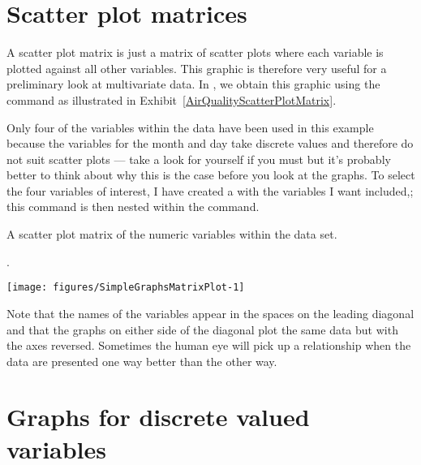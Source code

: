\section{Scatter plot matrices} 
\label{ScatterPlotMatrices} 
 
A scatter plot matrix is just a matrix of scatter plots where each variable is plotted against all other variables. This graphic is therefore very useful for a preliminary look at multivariate data. In \R{}, we obtain this graphic using the  command as illustrated in Exhibit~\ref{AirQualityScatterPlotMatrix}. 
 
Only four of the variables within the  data have been used in this example because the variables for the month and day take discrete values and therefore do not suit scatter plots --- take a look for yourself if you must but it's probably better to think about why this is the case before you look at the graphs. To select the four variables of interest, I have created a  with the variables I want included,; this  command is then nested within the  command. 
\begin{exhibit} 
\begin{center} 
\caption{A scatter plot matrix of the numeric variables within the  data set.} 
\label{AirQualityScatterPlotMatrix}. 
\begin{knitrout}
\color{fgcolor}\begin{kframe}
\begin{alltt}
\hlstd{> }\hlstd{(}
\end{alltt}
\end{kframe}
\texttt{[image: figures/SimpleGraphsMatrixPlot-1]} 

\end{knitrout}
\end{center} 
\end{exhibit} 
 
Note that the names of the variables appear in the spaces on the leading diagonal and that the graphs on either side of the diagonal plot the same data but with the axes reversed. Sometimes the human eye will pick up a relationship when the data are presented one way better than the other way. 
 
\section{Graphs for discrete valued variables} 
 
